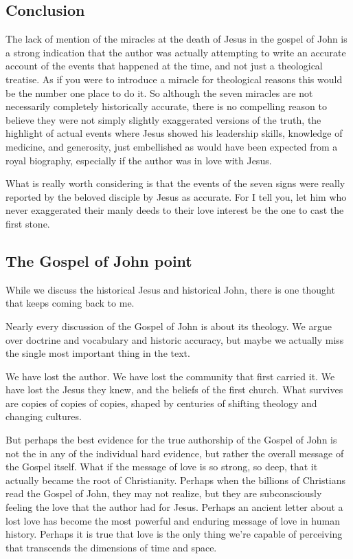 \subsection{Conclusion}\label{subsec:conclusion}

The lack of mention of the miracles at the death of Jesus in the gospel of John is a strong indication that the author was actually attempting to write an accurate account of the events that happened at the time, and not just a theological treatise.
As if you were to introduce a miracle for theological reasons this would be the number one place to do it.
So although the seven miracles are not necessarily completely historically accurate, there is no compelling reason to believe they were not simply slightly exaggerated versions of the truth, the highlight of actual events where Jesus showed his leadership skills, knowledge of medicine, and generosity, just embellished as would have been expected from a royal biography, especially if the author was in love with Jesus.

What is really worth considering is that the events of the seven signs were really reported by the beloved disciple by Jesus as accurate.
For I tell you, let him who never exaggerated their manly deeds to their love interest be the one to cast the first stone.

\subsection{The Gospel of John point}\label{subsec:the-gospel-of-john-point}

While we discuss the historical Jesus and historical John, there is one thought that keeps coming back to me.

Nearly every discussion of the Gospel of John is about its theology.
We argue over doctrine and vocabulary and historic accuracy, but maybe we actually miss the single most important thing in the text.

We have lost the author.
We have lost the community that first carried it.
We have lost the Jesus they knew, and the beliefs of the first church.
What survives are copies of copies of copies, shaped by centuries of shifting theology and changing cultures.

But perhaps the best evidence for the true authorship of the Gospel of John is not the in any of the individual hard evidence, but rather the overall message of the Gospel itself.
What if the message of love is so strong, so deep, that it actually became the root of Christianity.
Perhaps when the billions of Christians read the Gospel of John, they may not realize, but they are subconsciously feeling the love that the author had for Jesus.
Perhaps an ancient letter about a lost love has become the most powerful and enduring message of love in human history.
Perhaps it is true that love is the only thing we're capable of perceiving that transcends the dimensions of time and space.

